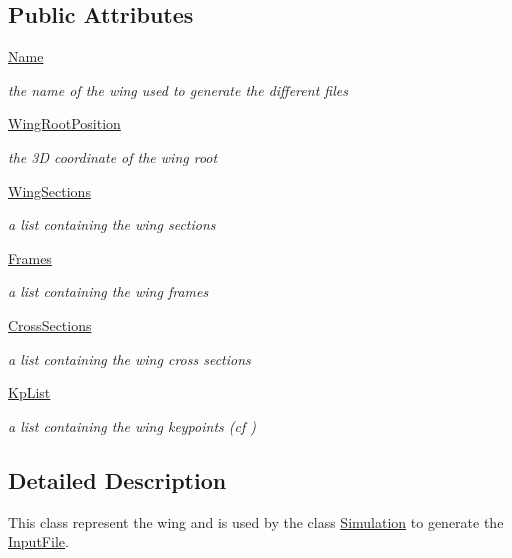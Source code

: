 \subsection*{Public Attributes}
\begin{DoxyCompactItemize}
\item 
\hyperlink{classgebtaero_1_1_wing_1_1_wing_a1c41ea89cf72ec60090134497f1ede15}{Name}
\begin{DoxyCompactList}\small\item\em the name of the wing used to generate the different files \end{DoxyCompactList}\item 
\hyperlink{classgebtaero_1_1_wing_1_1_wing_aa0957399544603f1df3cdb3b02eeda4a}{Wing\+Root\+Position}
\begin{DoxyCompactList}\small\item\em the 3D coordinate of the wing root \end{DoxyCompactList}\item 
\hyperlink{classgebtaero_1_1_wing_1_1_wing_a87db863f3c208b18c8e7594d75598a1d}{Wing\+Sections}
\begin{DoxyCompactList}\small\item\em a list containing the wing sections \end{DoxyCompactList}\item 
\hyperlink{classgebtaero_1_1_wing_1_1_wing_a4d4a29e2bd610166204d416d182b4b14}{Frames}
\begin{DoxyCompactList}\small\item\em a list containing the wing frames \end{DoxyCompactList}\item 
\hyperlink{classgebtaero_1_1_wing_1_1_wing_a31876f71184c1f5330aa22b2a51989ea}{Cross\+Sections}
\begin{DoxyCompactList}\small\item\em a list containing the wing cross sections \end{DoxyCompactList}\item 
\hyperlink{classgebtaero_1_1_wing_1_1_wing_a85da9f70285dd5be8a0983fa39b70fec}{Kp\+List}
\begin{DoxyCompactList}\small\item\em a list containing the wing keypoints (cf ) \end{DoxyCompactList}\end{DoxyCompactItemize}


\subsection{Detailed Description}
This class represent the wing and is used by the class \hyperlink{namespacegebtaero_1_1_simulation}{Simulation} to generate the \hyperlink{namespacegebtaero_1_1_input_file}{Input\+File}. 

